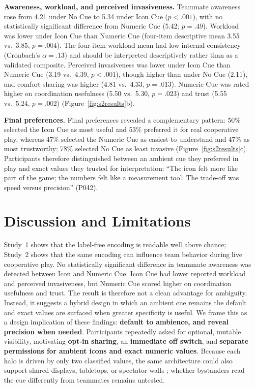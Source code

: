 \documentclass[sigconf]{acmart}
\begin{document}
\textbf{Awareness, workload, and perceived invasiveness.} Teammate awareness rose from 4.21 under No Cue to 5.34 under Icon Cue ($p<.001$), with no statistically significant difference from Numeric Cue (5.42; $p=.49$). Workload was lower under Icon Cue than Numeric Cue (four-item descriptive mean 3.55 vs.\ 3.85, $p=.004$). The four-item workload mean had low internal consistency (Cronbach's $\alpha=.13$) and should be interpreted descriptively rather than as a validated composite. Perceived invasiveness was lower under Icon Cue than Numeric Cue (3.19 vs.\ 4.39, $p<.001$), though higher than under No Cue (2.11), and comfort sharing was higher (4.81 vs.\ 4.33, $p=.013$). Numeric Cue was rated higher on coordination usefulness (5.50 vs.\ 5.30, $p=.023$) and trust (5.55 vs.\ 5.24, $p=.002$) (Figure~\ref{fig:s2results}b).

\textbf{Final preferences.} Final preferences revealed a complementary pattern: 50\% selected the Icon Cue as most useful and 53\% preferred it for real cooperative play, whereas 47\% selected the Numeric Cue as easiest to understand and 47\% as most trustworthy; 78\% selected No Cue as least invasive (Figure~\ref{fig:s2results}c). Participants therefore distinguished between an ambient cue they preferred in play and exact values they trusted for interpretation: ``The icon felt more like part of the game; the numbers felt like a measurement tool. The trade-off was speed versus precision'' (P042).

\section{Discussion and Limitations}
Study~1 shows that the label-free encoding is readable well above chance; Study~2 shows that the same encoding can influence team behavior during live cooperative play. No statistically significant difference in teammate awareness was detected between Icon and Numeric Cue. Icon Cue had lower reported workload and perceived invasiveness, but Numeric Cue scored higher on coordination usefulness and trust. The result is therefore not a clean advantage for ambiguity. Instead, it suggests a hybrid design in which an ambient cue remains the default and exact values are surfaced when greater specificity is useful. We frame this as a design implication of these findings: \textbf{default to ambience, and reveal precision when needed}. Participants repeatedly asked for optional, mutable visibility, motivating \textbf{opt-in sharing}, an \textbf{immediate off switch}, and \textbf{separate permissions for ambient icons and exact numeric values}. Because each halo is driven by only two classified values, the same architecture could also support shared displays, tabletops, or spectator walls \cite{morrisonsmith_ambiteam_2021}; whether bystanders read the cue differently from teammates remains untested.
\end{document}
